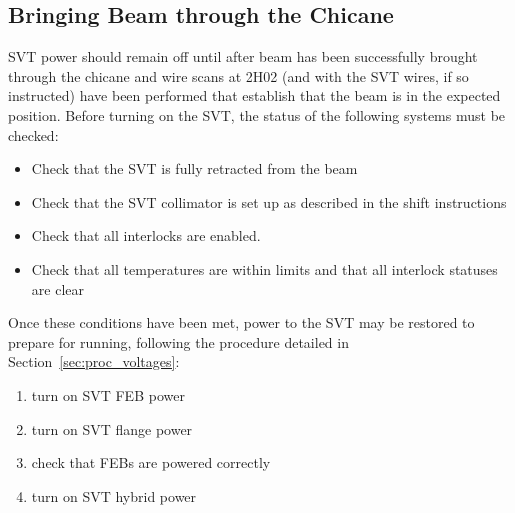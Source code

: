 \documentclass[12pt]{report}
\begin{document}
\subsection{Bringing Beam through the Chicane}
SVT power should remain off until after beam has been successfully brought through the chicane and wire scans at 2H02 (and with the SVT wires, if so instructed) have been performed that establish that the beam is in the expected position. Before turning on the SVT, the status of the following systems must be checked:

\begin{itemize}
\item Check that the SVT is fully retracted from the beam
\item Check that the SVT collimator is set up as described in the shift instructions
\item Check that all interlocks are enabled.
\item Check that all temperatures are within limits and that all interlock statuses are clear
\end{itemize}

Once these conditions have been met, power to the SVT may be restored to prepare for running, following the procedure detailed in Section~\ref{sec:proc_voltages}:
\begin{enumerate}
\item turn on  SVT FEB power
\item turn on  SVT flange power
\item check that FEBs are powered correctly
\item turn on SVT hybrid power
\end{enumerate}

\end{document}
